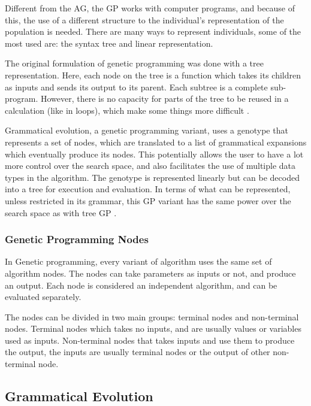 \documentclass[journal]{IEEEtran}
\begin{document}
Different from the AG, the GP works with computer programs, and because of this, the use of a different structure to the individual's representation of the population is needed. There are many ways to represent individuals, some of the most used are: the syntax tree and linear representation.

The original formulation of genetic programming was done with a tree representation. Here, each node on the tree is a function which takes its children as inputs and sends its output to its parent. Each subtree is a complete sub-program. However, there is no capacity for parts of the tree to be reused in a calculation (like in loops), which make some things more difficult \cite{harris2015comparison}. 

Grammatical evolution, a genetic programming variant, uses a genotype that represents a set of nodes, which are translated to a list of grammatical expansions which eventually produce its nodes. This potentially allows the user to have a lot more control over the search space, and also facilitates the use of multiple data types in the algorithm. The genotype is represented linearly but can be decoded into a tree for execution and evaluation. In terms of what can be represented, unless restricted in its grammar, this GP variant has the same power over the search space as with tree GP \cite{harris2015comparison}.

\subsubsection{Genetic Programming Nodes}

In Genetic programming, every variant of algorithm uses the same set of algorithm nodes. The nodes can take parameters as inputs or not, and produce an output. Each node is considered an independent algorithm, and can be evaluated separately.

The nodes can be divided in two main groups: terminal nodes and non-terminal nodes. Terminal nodes which takes no inputs, and are usually values or variables used as inputs. Non-terminal nodes that takes inputs and use them to produce the output, the inputs are usually terminal nodes or the output of other non-terminal node.

\subsection{Grammatical Evolution}
\label{subsection:grammaticalEvolution}
\end{document}

